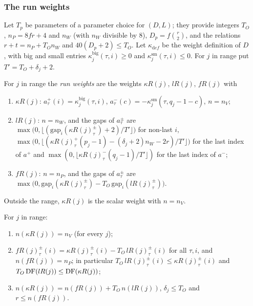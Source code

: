 \subsubsection{The run weights}

Let $T_p$ be parameters of a parameter choice for $(D,L)$; they provide integers $T_O$, $n_P=8fr+4$ and $n_W$ (with
$n_W$ divisible by $8$), $D_p=f\binom r2$, and the relations $r+t=n_P+T_On_W$ and $40(D_p+2)\le T_O$. Let $\kappa_{\mathrm
def}$ be the weight definition of $D$, with big and small entries $\kappa^{\mathrm{big}}_j(\tau,i)\ge0$ and
$\kappa^{\mathrm{sm}}_j(\tau,i)\le0$. For $j$ in range put $T'=T_O+\delta_j+2$.

\begin{definition}\label{pf:onto3:runweights}
For $j$ in range the \emph{run weights} are the weights $\kappa R(j)$, $lR(j)$, $fR(j)$ with
\begin{enumerate}[label=(\roman*)]
\item $\kappa R(j)$: $a^+_\tau(i)=\kappa^{\mathrm{big}}_j(\tau,i)$, $a^-_\tau(c)=-\kappa^{\mathrm{sm}}_j(\tau,q_j-1-c)$,
$n=n_V$;
\item $lR(j)$: $n=n_W$, and the gaps of $a^\pm_\tau$ are $\max\bigl(0,\lfloor(\mathrm{gap}_i(\kappa R(j)^\pm_\tau)+2)/T'
\rfloor\bigr)$ for non-last $i$, $\max\bigl(0,\lfloor(\kappa R(j)^+_\tau(p_j-1)-(\delta_j+2)n_W-2r)/T'\rfloor\bigr)$
for the last index of $a^+$ and $\max(0,\lfloor\kappa R(j)^-_\tau(q_j-1)/T'\rfloor)$ for the last index of $a^-$;
\item $fR(j)$: $n=n_P$, and the gaps of $a^\pm_\tau$ are $\max\bigl(0,\mathrm{gap}_i(\kappa R(j)^\pm_\tau)-T_O\,\mathrm{gap}_i
(lR(j)^\pm_\tau)\bigr)$.
\end{enumerate}
Outside the range, $\kappa R(j)$ is the scalar weight with $n=n_V$.
\end{definition}

\begin{lemma}\label{pf:onto3:runsum}
For $j$ in range:
\begin{enumerate}[label=(\roman*)]
\item $n(\kappa R(j))=n_V$ (for every $j$);
\item $fR(j)^\pm_\tau(i)=\kappa R(j)^\pm_\tau(i)-T_O\,lR(j)^\pm_\tau(i)$ for all $\tau,i$, and $n(fR(j))=n_P$; in particular
$T_O\,lR(j)^\pm_\tau(i)\le\kappa R(j)^\pm_\tau(i)$ and $T_O\operatorname{DF}(lR(j))\le\operatorname{DF}(\kappa R(j))$;
\item $n(\kappa R(j))=n(fR(j))+T_O\,n(lR(j))$, $\delta_j\le T_O$ and $r\le n(fR(j))$.
\end{enumerate}
\end{lemma}

